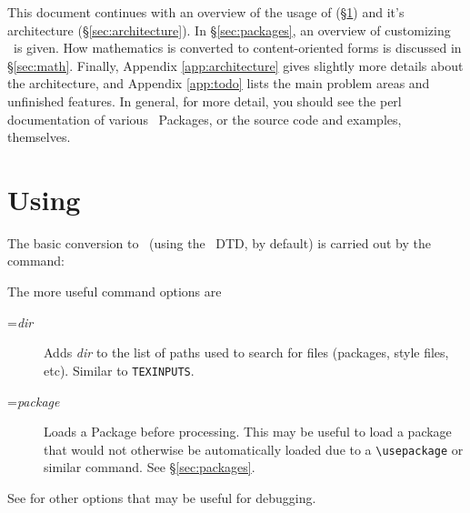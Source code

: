 \documentclass{article}
\begin{document}
\medskip
This document continues with an overview of the usage of \LaTeXML (\S\ref{sec:usage})
and it's architecture (\S\ref{sec:architecture}).   
In \S\ref{sec:packages}, an overview of customizing \LaTeXML\ is given.
How mathematics is converted to content-oriented forms is discussed in \S\ref{sec:math}.
Finally, Appendix \ref{app:architecture} gives slightly more details about the architecture,
and Appendix \ref{app:todo} lists the main problem areas and unfinished features.
In general, for more detail, you should see the perl documentation of various
\LaTeXML\ Packages, or the source code and examples, themselves.

\section{Using \LaTeXML}\label{sec:usage}
The basic conversion to \XML\ (using the \LaTeXML\ DTD, by default) is carried out
by the command:
\begin{quote}
\end{quote}
The more useful command options are
\begin{description}
\item[=\textit{dir}] Adds \textit{dir} to the list of paths used to search
  for files (packages, style files, etc). Similar to \texttt{TEXINPUTS}.
\item[=\textit{package}] Loads a Package before processing.  This may
  be useful to load a package that would not otherwise be automatically loaded 
  due to a \verb|\usepackage| or similar command.  See \S\ref{sec:packages}.
\end{description}
See  for other options that may be useful for debugging.
\end{document}
